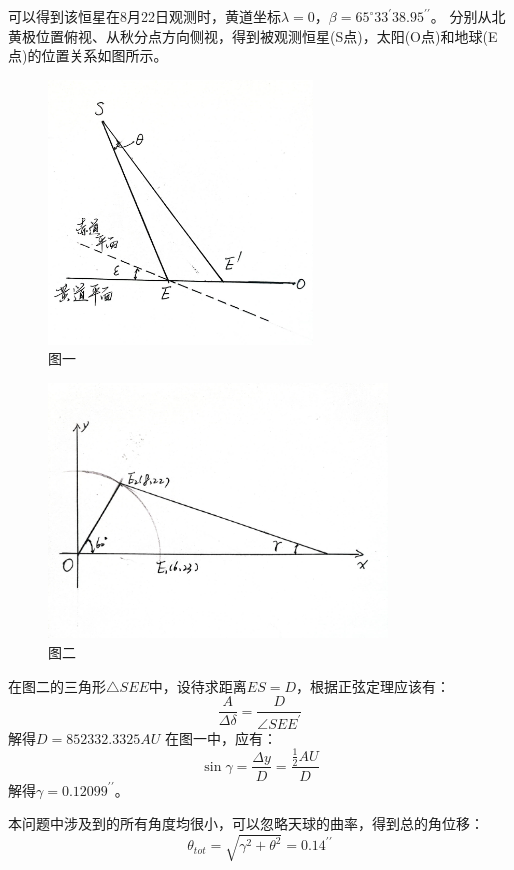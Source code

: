 \documentclass[a4paper,12pt]{report}
\begin{document}
\noindent 可以得到该恒星在8月22日观测时，黄道坐标$\lambda =0$，$\beta =65^\circ 33^\prime 38.95^{\prime\prime}$。
分别从北黄极位置俯视、从秋分点方向侧视，得到被观测恒星(S点)，太阳(O点)和地球(E点)的位置关系如图所示。
\begin{figure}[!h]
	\centering
	\includegraphics[width=7cm]{3_11B.jpg}
	\caption{图一}
\end{figure}

\begin{figure}[!h]
	\centering
	\includegraphics[width=9cm]{3_11A.jpg}
	\caption{图二}
\end{figure}

\noindent 在图二的三角形$\triangle SEE$中，设待求距离$ES=D$，根据正弦定理应该有：
\begin{equation}
	\frac{A}{\Delta \delta}=\frac{D}{\angle SEE^\prime}
\end{equation}
解得$D=852332.3325AU$
在图一中，应有：
\begin{equation}
	\sin \gamma =\frac{\Delta y}{D}=\frac{\frac{1}{2}AU}{D}
\end{equation}
解得$\gamma =0.12099^{\prime\prime}$。

\noindent 本问题中涉及到的所有角度均很小，可以忽略天球的曲率，得到总的角位移：
\begin{equation}
	\theta_{tot}=\sqrt{\gamma^2+\theta^2}=0.14^{\prime\prime}
\end{equation}
\end{document}
